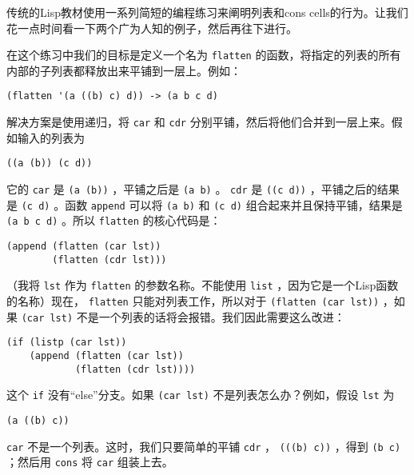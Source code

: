 传统的Lisp教材使用一系列简短的编程练习来阐明列表和cons cells的行为。让我们花一点时间看一下两个广为人知的例子，然后再往下进行。

在这个练习中我们的目标是定义一个名为 \texttt{flatten} 的函数，将指定的列表的所有内部的子列表都释放出来平铺到一层上。例如：

\begin{verbatim}
(flatten '(a ((b) c) d)) -> (a b c d)
\end{verbatim}

解决方案是使用递归，将 \texttt{car} 和 \texttt{cdr} 分别平铺，然后将他们合并到一层上来。假如输入的列表为

\begin{verbatim}
((a (b)) (c d))
\end{verbatim}

它的 \texttt{car} 是 \texttt{(a (b))} ，平铺之后是 \texttt{(a b)} 。 \texttt{cdr} 是 \texttt{((c d))} ，平铺之后的结果是 \texttt{(c d)} 。函数 \texttt{append} 可以将 \texttt{(a b)} 和 \texttt{(c d)} 组合起来并且保持平铺，结果是 \texttt{(a b c d)} 。所以 \texttt{flatten} 的核心代码是：

\begin{verbatim}
(append (flatten (car lst))
        (flatten (cdr lst)))
\end{verbatim}

（我将 \texttt{lst} 作为 \texttt{flatten} 的参数名称。不能使用 \texttt{list} ，因为它是一个Lisp函数的名称）现在， \texttt{flatten} 只能对列表工作，所以对于 \texttt{(flatten (car lst))} ，如果 \texttt{(car lst)} 不是一个列表的话将会报错。我们因此需要这么改进：

\begin{verbatim}
(if (listp (car lst))
    (append (flatten (car lst))
            (flatten (cdr lst))))
\end{verbatim}

这个 \texttt{if} 没有“else”分支。如果 \texttt{(car lst)} 不是列表怎么办？例如，假设 \texttt{lst} 为

\begin{verbatim}
(a ((b) c))
\end{verbatim}

 \texttt{car} 不是一个列表。这时，我们只要简单的平铺 \texttt{cdr} ， \texttt{(((b) c))} ，得到 \texttt{(b c)} ；然后用 \texttt{cons} 将 \texttt{car} 组装上去。

